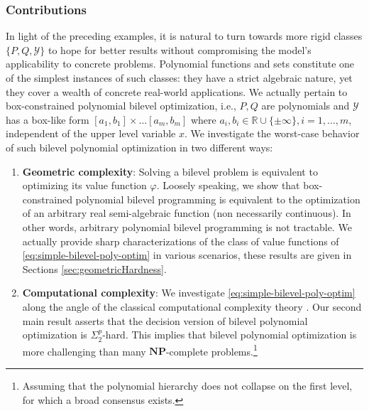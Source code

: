 \documentclass{article}
\newcommand*{\cY}{\mathcal{Y}}
\newcommand*{\RR}{\mathbb{R}}
\newcommand{\existleveltwo}{\Sigma_2^p}
\newcommand{\valbilevel}{\varphi}
\newcommand{\TL}[1]{\textcolor{red}{#1}}
\theoremstyle{plain}
\theoremstyle{definition}
\begin{document}
\subsubsection*{Contributions} 
In light of the preceding examples, it is natural to turn towards more rigid classes $\{P,Q,\cY\}$ to hope for better results without compromising the model's applicability to concrete problems. Polynomial functions and sets constitute one of the simplest instances of such classes: they have a strict algebraic nature, yet they cover a wealth of concrete real-world applications. %
We actually pertain to box-constrained polynomial bilevel optimization, i.e., $P, Q$ are polynomials and $\cY$ has a box-like form $[a_1,b_1] \times \ldots [a_m, b_m]$ where $a_i, b_i \in \RR \cup \{\pm \infty\}, i = 1, \ldots, m$, independent of the upper level variable $x$. %
We investigate the worst-case behavior of such  bilevel polynomial optimization in two different ways:
\begin{enumerate}
    \item \textbf{Geometric complexity}: Solving a bilevel problem is equivalent to optimizing its value function $\valbilevel$. Loosely speaking, we show that box-constrained polynomial bilevel programming is equivalent to the optimization of an arbitrary real semi-algebraic function (non necessarily continuous). In other words, arbitrary polynomial bilevel programming is not tractable. We actually provide sharp characterizations of the class of value functions of \eqref{eq:simple-bilevel-poly-optim} in various scenarios, these results are given in Sections \ref{sec:geometricHardness}.
    \item \textbf{Computational complexity}: We investigate \eqref{eq:simple-bilevel-poly-optim} along the angle of the classical computational complexity theory \cite{arora2009computational}. Our second main result asserts that the decision version of bilevel polynomial optimization is $\existleveltwo$-hard. This implies that bilevel polynomial optimization is more challenging than many $\textbf{NP}$-complete problems.\footnote{Assuming that the polynomial hierarchy does not collapse on the first level, for which a broad consensus exists.}%
\end{enumerate}
\end{document}
